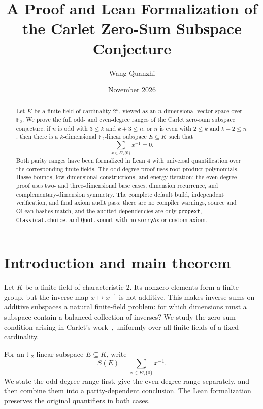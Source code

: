 \documentclass[11pt]{amsart}
\title[The Carlet zero-sum subspace conjecture]{A Proof and Lean Formalization of the Carlet Zero-Sum Subspace Conjecture}
\author{Wang Quanzhi}
\date{November 2026}
\numberwithin{equation}{section}
\theoremstyle{definition}
\theoremstyle{remark}
\newcommand{\Ftwo}{\mathbb F_2}
\begin{document}
\begin{abstract}
Let $K$ be a finite field of cardinality $2^n$, viewed as an $n$-dimensional vector space over $\Ftwo$. We prove the full odd- and even-degree ranges of the Carlet zero-sum subspace conjecture: if $n$ is odd with $3\le k$ and $k+3\le n$, or $n$ is even with $2\le k$ and $k+2\le n$, then there is a $k$-dimensional $\Ftwo$-linear subspace $E\subseteq K$ such that
\[
  \sum_{x\in E\setminus\{0\}}x^{-1}=0.
\]
Both parity ranges have been formalized in Lean 4 with universal quantification over the corresponding finite fields. The odd-degree proof uses root-product polynomials, Hasse bounds, low-dimensional constructions, and energy iteration; the even-degree proof uses two- and three-dimensional base cases, dimension recurrence, and complementary-dimension symmetry. The complete default build, independent verification, and final axiom audit pass: there are no compiler warnings, source and OLean hashes match, and the audited dependencies are only \texttt{propext}, \texttt{Classical.choice}, and \texttt{Quot.sound}, with no \texttt{sorryAx} or custom axiom.
\end{abstract}


\maketitle

\section{Introduction and main theorem}

Let $K$ be a finite field of characteristic $2$. Its nonzero elements form a finite group, but the inverse map $x\mapsto x^{-1}$ is not additive. This makes inverse sums on additive subspaces a natural finite-field problem: for which dimensions must a subspace contain a balanced collection of inverses? We study the zero-sum condition arising in Carlet's work~\cite{Carlet2025}, uniformly over all finite fields of a fixed cardinality.

For an $\Ftwo$-linear subspace $E\subseteq K$, write
\[
 S(E)=\sum_{x\in E\setminus\{0\}}x^{-1}.
\]
We state the odd-degree range first, give the even-degree range separately, and then combine them into a parity-dependent conclusion. The Lean formalization preserves the original quantifiers in both cases.
\end{document}
